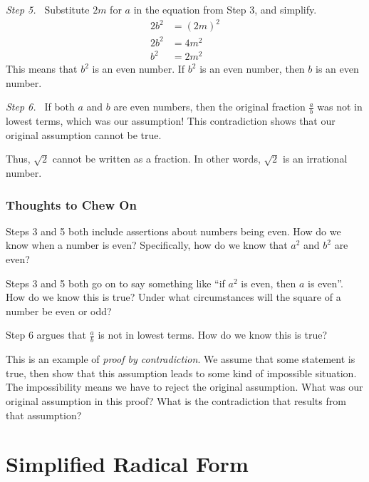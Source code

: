 \textit{Step 5.~} Substitute $2m$ for $a$ in the equation from Step 3, and simplify.\[\begin{aligned} 2b^2 &= (2m)^2 \\ 2b^2 &= 4m^2 \\ b^2 &= 2m^2 \end{aligned}\] This means that $b^2$ is an even number. If $b^2$ is an even number, then $b$ is an even number.

\textit{Step 6.~} If both $a$ and $b$ are even numbers, then the original fraction $\frac{a}{b}$ was not in lowest terms, which was our assumption! This contradiction shows that our original assumption cannot be true.

Thus, $\sqrt{2}$ cannot be written as a fraction. In other words, $\sqrt2$ is an irrational number.

\subsubsection{Thoughts to Chew On}

Steps 3 and 5 both include assertions about numbers being even. How do we know when a number is even? Specifically, how do we know that $a^2$ and $b^2$ are even?

Steps 3 and 5 both go on to say something like ``if $a^2$ is even, then $a$ is even''. How do we know this is true? Under what circumstances will the square of a number be even or odd?

Step 6 argues that $\frac{a}{b}$ is not in lowest terms. How do we know this is true?

This is an example of \textit{proof by contradiction}. We assume that some statement is true, then show that this assumption leads to some kind of impossible situation. The impossibility means we have to reject the original assumption. What was our original assumption in this proof? What is the contradiction that results from that assumption?

\section{Simplified Radical Form}
\label{sec:radsimplifiedform}



